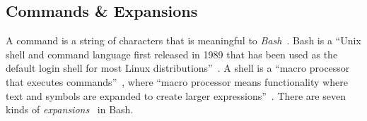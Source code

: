 \subsection{Commands \& Expansions}

A command is a string of characters that is meaningful to \emph{Bash}~\cite{gnu_bash}. Bash is a \enquote{Unix shell and command language first released in 1989 that has been used as the default login shell for most Linux distributions}~\cite{bash}. A shell is a \enquote{macro processor that executes commands}~\cite{bash_manual}, where \enquote{macro processor means functionality where text and symbols are expanded to create larger expressions}~\cite{bash_manual}. There are seven kinds of \emph{expansions}~\cite{bash_expansions_ref} in Bash.



